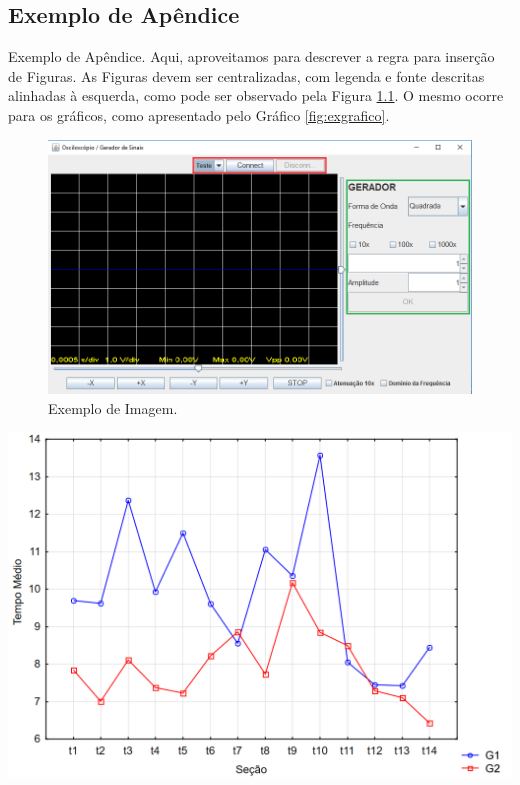 \begin{apendicesenv}

\chapter{Exemplo de Apêndice}
\label{cap:apendice}

    Exemplo de Apêndice. Aqui, aproveitamos para descrever a regra para inserção de Figuras. As Figuras devem ser centralizadas, com legenda e fonte descritas alinhadas à esquerda, como pode ser observado pela Figura \ref{fig:exemplo}. O mesmo ocorre para os gráficos, como apresentado pelo Gráfico \ref{fig:exgrafico}.

    \begin{figure}[h]
        \caption{Exemplo de Imagem.}
        \begin{center}
            \includegraphics[width=0.6\linewidth]{Imagens/Tela.png}
        \end{center}
        \label{fig:exemplo}
    \end{figure}

    \begin{grafico}[h]
        \caption{Exemplo de Gráfico.}
        \begin{center}
            \includegraphics[width=0.6\linewidth]{Imagens/grafico.png}
        \end{center}
        \label{fig:exgrafico}
    \end{grafico}


\end{apendicesenv}
